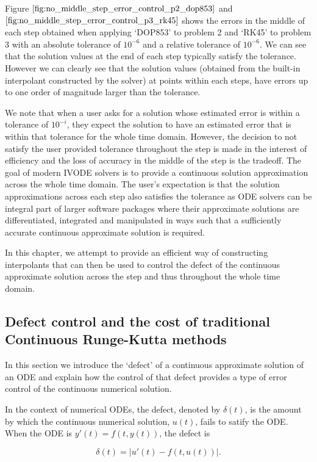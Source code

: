 Figure $\ref{fig:no_middle_step_error_control_p2_dop853}$ and $\ref{fig:no_middle_step_error_control_p3_rk45}$ shows the errors in the middle of each step obtained when applying `DOP853' to problem 2 and `RK45' to problem 3 with an absolute tolerance of $10^{-6}$ and a relative tolerance of $10^{-6}$. We can see that the solution values at the end of each step typically satisfy the tolerance. However we can clearly see that the solution values (obtained from the built-in interpolant constructed by the solver) at points within each steps, have errors up to one order of magnitude larger than the tolerance. 

We note that when a user asks for a solution whose estimated error is within a tolerance of $10^{-i}$, they expect the solution to have an estimated error that is within that tolerance for the whole time domain. However, the decision to not satisfy the user provided tolerance throughout the step is made in the interest of efficiency and the loss of accuracy in the middle of the step is the tradeoff. The goal of modern IVODE solvers is to provide a continuous solution approximation across the whole time domain. The user's expectation is that the solution approximations across each step also satisfies the tolerance as ODE solvers can be integral part of larger software packages where their approximate solutions are differentiated, integrated and manipulated in ways such that a sufficiently accurate continuous approximate solution is required. 

In this chapter, we attempt to provide an efficient way of constructing interpolants that can then be used to control the defect of the continuous approximate solution across the step and thus throughout the whole time domain.

\subsection{Defect control and the cost of traditional Continuous Runge-Kutta methods}
\label{section:crk_related_work}
In this section we introduce the `defect' of a continuous approximate solution of an ODE and explain how the control of that defect provides a type of error control of the continuous numerical solution.

In the context of numerical ODEs, the defect, denoted by $\delta(t)$,  is the amount by which the continuous numerical solution, $u(t)$, fails to satify the ODE. When the ODE is $y'(t) = f(t, y(t))$, the defect is 

\begin{equation}
\delta(t) = |u'(t) - f(t, u(t))|.
\end{equation}


